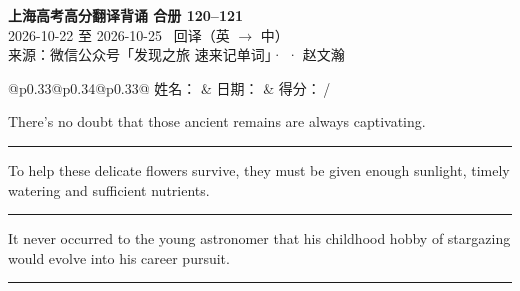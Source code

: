 \documentclass[11pt,a4paper]{article}
\newcommand{\num}[1]{\makebox[1.9em][r]{#1.}\hspace{0.3em}}
\newcommand{\wline}{\noindent\rule{\linewidth}{0.4pt}}
\begin{document}
\pagestyle{plain}
\begin{center}
{\LARGE\bfseries 上海高考高分翻译背诵 \quad 合册 120–121}\\[0.25em]
{\large 2026-10-22 至 2026-10-25 \quad\ 回译（英 $\to$ 中）}\\[0.35em]
{\footnotesize 来源：微信公众号「发现之旅 速来记单词」·  · 赵文瀚}
\end{center}

\vspace{0.4em}
\noindent\begin{tabular}{@{}p{0.33\textwidth}@{}p{0.34\textwidth}@{}p{0.33\textwidth}@{}}
姓名：\underline{\hspace{2.0cm}} & 日期：\underline{\hspace{2.0cm}} & 得分：\underline{\hspace{1.4cm}}\,/ \\
\end{tabular}

\vspace{0.5em}

\vspace{0.8em}
\vspace{0.35em}\vspace{0.15em}

\begin{minipage}{\linewidth}

\num{1}There’s no doubt that those ancient remains are always captivating.

\vspace{0.25em}

\wline

\end{minipage}

\begin{minipage}{\linewidth}

\num{2}To help these delicate flowers survive, they must be given enough sunlight, timely watering and sufficient nutrients.

\vspace{0.25em}

\wline

\end{minipage}

\begin{minipage}{\linewidth}

\num{3}It never occurred to the young astronomer that his childhood hobby of stargazing would evolve into his career pursuit.

\vspace{0.25em}

\wline

\end{minipage}
\end{document}
